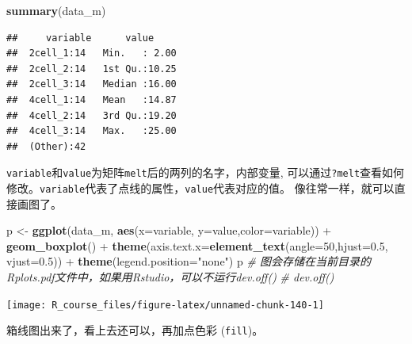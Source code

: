 \documentclass[]{article}
\newenvironment{Shaded}{\begin{snugshade}}{\end{snugshade}}
\newcommand{\KeywordTok}[1]{\textcolor[rgb]{0.13,0.29,0.53}{\textbf{{#1}}}}
\newcommand{\DataTypeTok}[1]{\textcolor[rgb]{0.13,0.29,0.53}{{#1}}}
\newcommand{\DecValTok}[1]{\textcolor[rgb]{0.00,0.00,0.81}{{#1}}}
\newcommand{\FloatTok}[1]{\textcolor[rgb]{0.00,0.00,0.81}{{#1}}}
\newcommand{\StringTok}[1]{\textcolor[rgb]{0.31,0.60,0.02}{{#1}}}
\newcommand{\CommentTok}[1]{\textcolor[rgb]{0.56,0.35,0.01}{\textit{{#1}}}}
\newcommand{\NormalTok}[1]{{#1}}
\numberwithin{figure}{section}
\numberwithin{table}{section}
\theoremstyle{definition}
\theoremstyle{definition}
\theoremstyle{definition}
\theoremstyle{remark}
\begin{document}
\begin{Shaded}
\begin{Highlighting}[]
\KeywordTok{summary}\NormalTok{(data_m)}
\end{Highlighting}
\end{Shaded}

\begin{verbatim}
##     variable      value      
##  2cell_1:14   Min.   : 2.00  
##  2cell_2:14   1st Qu.:10.25  
##  2cell_3:14   Median :16.00  
##  4cell_1:14   Mean   :14.87  
##  4cell_2:14   3rd Qu.:19.20  
##  4cell_3:14   Max.   :25.00  
##  (Other):42
\end{verbatim}

\texttt{variable}和\texttt{value}为矩阵\texttt{melt}后的两列的名字，内部变量,
可以通过\texttt{?melt}查看如何修改。\texttt{variable}代表了点线的属性，\texttt{value}代表对应的值。
像往常一样，就可以直接画图了。

\begin{Shaded}
\begin{Highlighting}[]
\NormalTok{p <-}\StringTok{ }\KeywordTok{ggplot}\NormalTok{(data_m, }\KeywordTok{aes}\NormalTok{(}\DataTypeTok{x=}\NormalTok{variable, }\DataTypeTok{y=}\NormalTok{value,}\DataTypeTok{color=}\NormalTok{variable)) +}\StringTok{ }
\KeywordTok{geom_boxplot}\NormalTok{() +}\StringTok{ }
\KeywordTok{theme}\NormalTok{(}\DataTypeTok{axis.text.x=}\KeywordTok{element_text}\NormalTok{(}\DataTypeTok{angle=}\DecValTok{50}\NormalTok{,}\DataTypeTok{hjust=}\FloatTok{0.5}\NormalTok{, }\DataTypeTok{vjust=}\FloatTok{0.5}\NormalTok{)) +}
\KeywordTok{theme}\NormalTok{(}\DataTypeTok{legend.position=}\StringTok{"none"}\NormalTok{)}
\NormalTok{p}
\CommentTok{# 图会存储在当前目录的Rplots.pdf文件中，如果用Rstudio，可以不运行dev.off()}
\CommentTok{# dev.off()}
\end{Highlighting}
\end{Shaded}

\begin{center}\texttt{[image: R\_course\_files/figure-latex/unnamed-chunk-140-1]} \end{center}

箱线图出来了，看上去还可以，再加点色彩 (\texttt{fill})。
\end{document}
